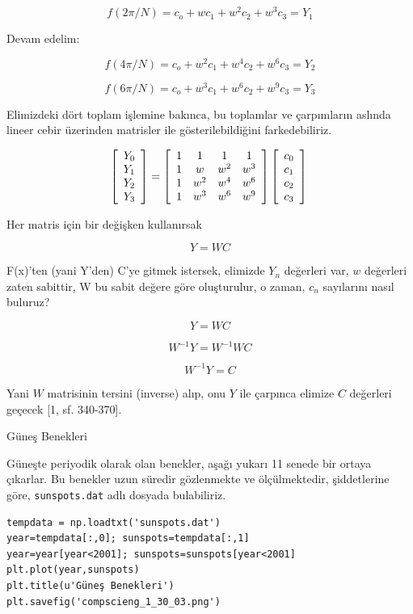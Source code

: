 \documentclass[12pt,fleqn]{article}\usepackage{../../common}
\begin{document}
$$ f(2\pi/N) = c_o + wc_1 + w^2c_2 + w^3c_3 = Y_1 $$

Devam edelim:

$$ f(4\pi/N) = c_o + w^2c_1 + w^4c_2 + w^6c_3 = Y_2  $$

$$ f(6\pi/N) = c_o + w^3c_1 + w^6c_2 + w^9c_3 = Y_3  $$

Elimizdeki dört toplam işlemine bakınca, bu toplamlar ve çarpımların aslında
lineer cebir üzerinden matrisler ile gösterilebildiğini farkedebiliriz. 

$$  
\left[ \begin{array}{c}
    Y_0 \\
    Y_1 \\
    Y_2 \\
    Y_3
\end{array} \right]
=
\left[ \begin{array}{cccc}
    1 & 1 & 1 & 1 \\
    1 & w & w^2 & w^3  \\
    1 & w^2 & w^4 & w^6  \\
    1 & w^3 & w^6 & w^9  
\end{array} \right]
\left[ \begin{array}{c}
    c_0 \\
    c_1 \\
    c_2 \\
    c_3
\end{array} \right] \\
$$

Her matris için bir değişken kullanırsak

$$ Y = WC $$

F(x)'ten (yani Y'den) C'ye gitmek istersek, elimizde $Y_n$ değerleri var, $w$
değerleri zaten sabittir, W bu sabit değere göre oluşturulur, o zaman, $c_n$
sayılarını nasıl buluruz?

$$ Y = WC  $$

$$ W^{-1}Y = W^{-1}WC  $$

$$ W^{-1}Y = C $$

Yani $W$ matrisinin tersini (inverse) alıp, onu $Y$ ile çarpınca elimize $C$
değerleri geçecek [1, sf. 340-370].

Güneş Benekleri

Güneşte periyodik olarak olan benekler, aşağı yukarı 11 senede bir ortaya
çıkarlar. Bu benekler uzun süredir gözlenmekte ve ölçülmektedir,
şiddetlerine göre, \verb!sunspots.dat! adlı dosyada bulabiliriz. 

\begin{verbatim}
tempdata = np.loadtxt('sunspots.dat')
year=tempdata[:,0]; sunspots=tempdata[:,1]
year=year[year<2001]; sunspots=sunspots[year<2001]
plt.plot(year,sunspots)
plt.title(u'Güneş Benekleri')
plt.savefig('compscieng_1_30_03.png')
\end{verbatim}
\end{document}
